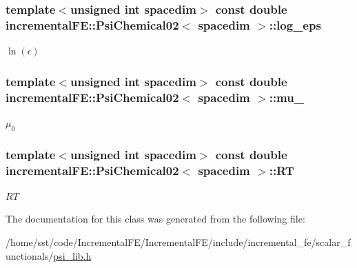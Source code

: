 \subsubsection[{\texorpdfstring{log\+\_\+eps}{log_eps}}]{\setlength{\rightskip}{0pt plus 5cm}template$<$unsigned int spacedim$>$ const double {\bf incremental\+F\+E\+::\+Psi\+Chemical02}$<$ spacedim $>$\+::log\+\_\+eps\hspace{0.3cm}{\ttfamily [private]}}\hypertarget{classincremental_f_e_1_1_psi_chemical02_a37ddfb3a86936177344fafd95f8eb377}{}\label{classincremental_f_e_1_1_psi_chemical02_a37ddfb3a86936177344fafd95f8eb377}
$\ln(\epsilon)$ 
\subsubsection[{\texorpdfstring{mu\+\_\+0}{mu_0}}]{\setlength{\rightskip}{0pt plus 5cm}template$<$unsigned int spacedim$>$ const double {\bf incremental\+F\+E\+::\+Psi\+Chemical02}$<$ spacedim $>$\+::mu\+\_\hspace{0.3cm}{\ttfamily [private]}}\hypertarget{classincremental_f_e_1_1_psi_chemical02_a70426dc3fa6acda53984c2e178ad92c5}{}\label{classincremental_f_e_1_1_psi_chemical02_a70426dc3fa6acda53984c2e178ad92c5}
$\mu_0$ 
\subsubsection[{\texorpdfstring{RT}{RT}}]{\setlength{\rightskip}{0pt plus 5cm}template$<$unsigned int spacedim$>$ const double {\bf incremental\+F\+E\+::\+Psi\+Chemical02}$<$ spacedim $>$\+::RT\hspace{0.3cm}{\ttfamily [private]}}\hypertarget{classincremental_f_e_1_1_psi_chemical02_a4b93e968af97d8497a53be13980ef22e}{}\label{classincremental_f_e_1_1_psi_chemical02_a4b93e968af97d8497a53be13980ef22e}
$RT$ 

The documentation for this class was generated from the following file\+:\begin{DoxyCompactItemize}
\item 
/home/sst/code/\+Incremental\+F\+E/\+Incremental\+F\+E/include/incremental\+\_\+fe/scalar\+\_\+functionals/\hyperlink{psi__lib_8h}{psi\+\_\+lib.\+h}\end{DoxyCompactItemize}
